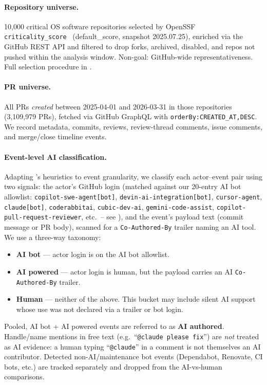 
\paragraph{Repository universe.} 10,000{} critical OS software repositories selected by OpenSSF \texttt{criticality\_score}~\citep{ossf-criticality} (default\_score, snapshot 2025.07.25{}), enriched via the GitHub REST API and filtered to drop forks, archived, disabled, and repos not pushed within the analysis window. Non-goal: GitHub-wide representativeness. Full selection procedure in .

\paragraph{PR universe.} All PRs \emph{created} between 2025-04-01 and 2026-03-31 in those repositories (3,109,979{} PRs), fetched via GitHub GraphQL with \texttt{orderBy:{CREATED\_AT,DESC}}. We record metadata, commits, reviews, review-thread comments, issue comments, and merge/close timeline events.

\paragraph{Event-level AI classification.} Adapting \citet{ghaleb2026fingerprinting}'s heuristics to event granularity, we classify each actor--event pair using two signals: the actor's GitHub login (matched against our 20-entry AI bot allowlist: \texttt{copilot-swe-agent[bot]}, \texttt{devin-ai-integration[bot]}, \texttt{cursor-agent}, \texttt{claude[bot]}, \texttt{coderabbitai}, \texttt{cubic-dev-ai}, \texttt{gemini-code-assist}, \texttt{copilot-pull-request-reviewer}, etc.\ -- see ), and the event's payload text (commit message or PR body), scanned for a \texttt{Co-Authored-By} trailer naming an AI tool. We use a three-way taxonomy:
\begin{itemize}
\item \textbf{AI bot} --- actor login is on the AI bot allowlist.
\item \textbf{AI powered} --- actor login is human, but the payload carries an AI \texttt{Co-Authored-By} trailer.
\item \textbf{Human} --- neither of the above. This bucket may include silent AI support whose use was not declared via a trailer or bot login.
\end{itemize}
Pooled, AI bot $+$ AI powered events are referred to as \textbf{AI authored}. Handle/name mentions in free text (e.g.\ ``\texttt{@claude please fix}'') are \emph{not} treated as AI evidence: a human typing ``\texttt{@claude}'' in a comment is not themselves an AI contributor. Detected non-AI/maintenance bot events (Dependabot, Renovate, CI bots, etc.) are tracked separately and dropped from the AI-vs-human comparisons.


